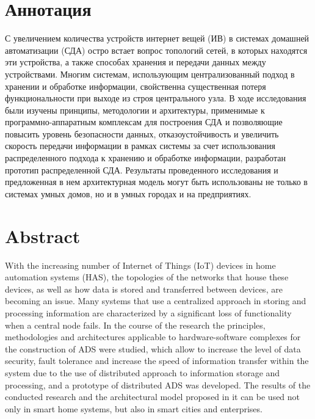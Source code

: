 \documentclass[a4paper,12pt]{article}
\begin{document}

%



\section*{Аннотация}

С увеличением количества устройств интернет вещей (ИВ) в системах домашней автоматизации (СДА) остро встает вопрос топологий сетей, в которых находятся эти устройства, а также способах хранения и передачи данных между устройствами. Многим системам, использующим централизованный подход в хранении и обработке информации, свойственна существенная потеря функциональности при выходе из строя центрального узла. В ходе исследования были изучены принципы, методологии и архитектуры, применимые к программно-аппаратным комплексам для построения СДА и позволяющие повысить уровень безопасности данных, отказоустойчивость и увеличить скорость передачи информации в рамках системы за счет использования распределенного подхода к хранению и обработке информации, разработан прототип распределенной СДА. Результаты проведенного исследования и предложенная в нем архитектурная модель могут быть использованы не только в системах умных домов, но и в умных городах и на предприятиях.

\section*{Abstract}

With the increasing number of Internet of Things (IoT) devices in home automation systems (HAS), the topologies of the networks that house these devices, as well as how data is stored and transferred between devices, are becoming an issue. Many systems that use a centralized approach in storing and processing information are characterized by a significant loss of functionality when a central node fails. In the course of the research the principles, methodologies and architectures applicable to hardware-software complexes for the construction of ADS were studied, which allow to increase the level of data security, fault tolerance and increase the speed of information transfer within the system due to the use of distributed approach to information storage and processing, and a prototype of distributed ADS was developed. The results of the conducted research and the architectural model proposed in it can be used not only in smart home systems, but also in smart cities and enterprises.
\end{document}
